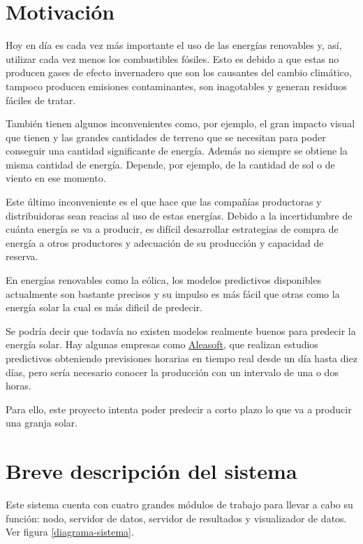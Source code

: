 \section{Motivación}
\label{makereference1.1}

Hoy en día es cada vez más importante el uso de las energías renovables y, así, utilizar cada vez menos los combustibles fósiles. Esto es debido a que estas no producen gases de efecto invernadero que son los causantes del cambio climático, tampoco producen emisiones contaminantes, son inagotables y generan residuos fáciles de tratar.

También tienen algunos inconvenientes como, por ejemplo, el gran impacto visual que tienen y las grandes cantidades de terreno que se necesitan para poder conseguir una cantidad significante de energía. Además no siempre se obtiene la misma cantidad de energía. Depende, por ejemplo, de la cantidad de sol o de viento en ese momento.

Este último inconveniente es el que hace que las compañías productoras y distribuidoras sean reacias al uso de estas energías. Debido a la incertidumbre de cuánta energía se va a producir, es difícil desarrollar estrategias de compra de energía a otros productores y adecuación de su producción y capacidad de reserva.

En energías renovables como la eólica, los modelos predictivos disponibles actualmente son bastante precisos y su impulso es más fácil que otras como la energía solar la cual es más dificil de predecir.

Se podría decir que todavía no existen modelos realmente buenos para predecir la energía solar. Hay algunas empresas como \href{https://aleasoft.com/es/}{Aleasoft}, que realizan estudios predictivos obteniendo previsiones horarias en tiempo real desde un día hasta diez días, pero sería necesario conocer la producción con un intervalo de una o dos horas.

Para ello, este proyecto intenta poder predecir a corto plazo lo que va a producir una granja solar.

\section{Breve descripción del sistema}
\label{makereference1.2}

Este sistema cuenta con cuatro grandes módulos de trabajo para llevar a cabo su función: nodo, servidor de datos, servidor de resultados y visualizador de datos. Ver figura \ref{diagrama-sistema}.

